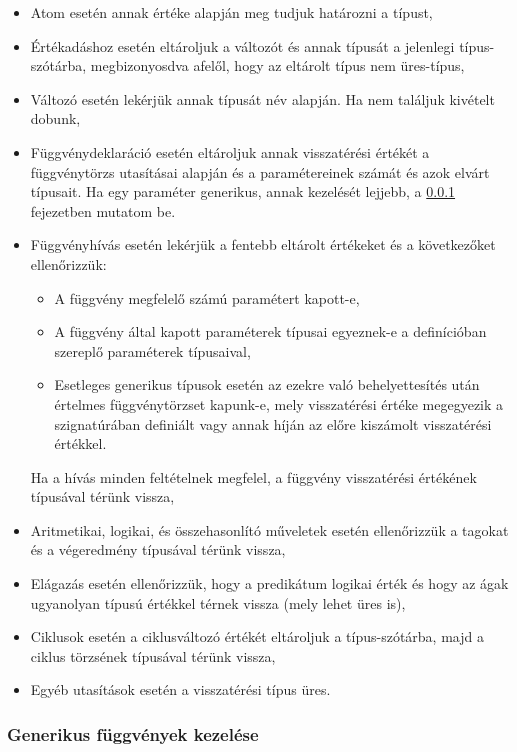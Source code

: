 \begin{itemize}
    \item Atom esetén annak értéke alapján meg tudjuk határozni a típust,
    \item Értékadáshoz esetén eltároljuk a változót és annak típusát a jelenlegi típus-szótárba, megbizonyosdva afelől, hogy az eltárolt típus nem üres-típus,
    \item Változó esetén lekérjük annak típusát név alapján. Ha nem találjuk kivételt dobunk,
    \item Függvénydeklaráció esetén eltároljuk annak visszatérési értékét a függvénytörzs utasításai alapján és a paramétereinek számát és azok elvárt típusait. Ha egy paraméter generikus, annak kezelését lejjebb, a \ref{sec:generic} fejezetben mutatom be.
    \item Függvényhívás esetén lekérjük a fentebb eltárolt értékeket és a következőket ellenőrizzük:
    \begin{itemize}
        \item A függvény megfelelő számú paramétert kapott-e,
        \item A függvény által kapott paraméterek típusai egyeznek-e a definícióban szereplő paraméterek típusaival,
        \item Esetleges generikus típusok esetén az ezekre való behelyettesítés után értelmes függvénytörzset kapunk-e, mely visszatérési értéke megegyezik a szignatúrában definiált vagy annak híján az előre kiszámolt visszatérési értékkel.
    \end{itemize}
    Ha a hívás minden feltételnek megfelel, a függvény visszatérési értékének típusával térünk vissza,
    \item Aritmetikai, logikai, és összehasonlító műveletek esetén ellenőrizzük a tagokat és a végeredmény típusával térünk vissza,
    \item Elágazás esetén ellenőrizzük, hogy a predikátum logikai érték és hogy az ágak ugyanolyan típusú értékkel térnek vissza (mely lehet üres is),
    \item Ciklusok esetén a ciklusváltozó értékét eltároljuk a típus-szótárba, majd a ciklus törzsének típusával térünk vissza,
    \item Egyéb utasítások esetén a visszatérési típus üres. 
\end{itemize}

\subsubsection{Generikus függvények kezelése}
\label{sec:generic}

